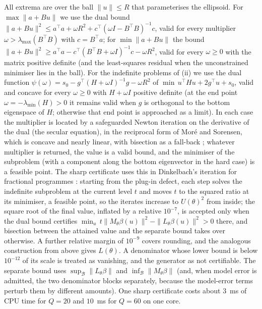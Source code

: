 All extrema are over the ball $\|u\| \le R$ that parameterises the ellipsoid.
For $\max\|a + Bu\|$ we use the dual bound $\|a+Bu\|^2 \le a^{\!\top}a + \omega R^2
+ c^{\!\top}(\omega I - B^{\!\top}B)^{-1}c$, valid for every multiplier $\omega >
\lambda_{\max}(B^{\!\top}B)$ with $c = B^{\!\top}a$; for $\min\|a+Bu\|$ the bound
$\|a+Bu\|^2 \ge a^{\!\top}a - c^{\!\top}(B^{\!\top}B + \omega I)^{-1}c - \omega R^2$,
valid for every $\omega \ge 0$ with the matrix positive definite (and the
least-squares residual when the unconstrained minimiser lies in the ball). For
the indefinite problems of (ii) we use the dual function
$\psi(\omega) = s_0 - g^{\!\top}(H + \omega I)^{-1}g - \omega R^2$ of
$\min\,u^{\!\top}Hu + 2g^{\!\top}u + s_0$, valid and concave for every
$\omega \ge 0$ with $H + \omega I$ positive definite (at the end point $\omega =
-\lambda_{\min}(H) > 0$ it remains valid when $g$ is orthogonal to the bottom
eigenspace of $H$; otherwise that end point is approached as a limit). In each case the multiplier is located by a safeguarded Newton iteration
on the derivative of the dual (the secular equation), in the reciprocal form of
Mor\'e and Sorensen, which is concave and nearly linear, with bisection as a
fall-back \citep{gander1989constrained,more1983computing,conn2000trust};
whatever multiplier is returned, the value is a valid bound, and the minimiser
of the subproblem (with a component along the bottom eigenvector in the hard
case) is a feasible point. The sharp certificate uses this in Dinkelbach's
iteration for fractional programmes \citep{dinkelbach1967nonlinear}: starting
from the plug-in defect, each step solves the indefinite subproblem at the
current level $t$ and moves $t$ to the squared ratio at its minimiser, a
feasible point, so the iterates increase to $U(\theta)^2$ from inside; the
square root of the final value, inflated by a relative $10^{-7}$, is accepted
only when the dual
bound certifies $\min_u\, t\|M_\theta\beta(u)\|^2 - \|L_\theta\beta(u)\|^2 > 0$
there, and bisection between the attained value and the separate bound takes
over otherwise. A further relative margin of $10^{-9}$ covers rounding, and the
analogous construction from above gives $L(\theta)$. A denominator whose lower
bound is below $10^{-12}$ of its scale is treated as vanishing, and the
generator as not certifiable. The separate bound uses
$\sup_{\mathcal B}\|L_\theta\beta\|$ and $\inf_{\mathcal B}\|M_\theta\beta\|$ (and,
when model error is admitted, the two denominator blocks separately, because
the model-error terms perturb them by different amounts). One sharp
certificate costs about $3$~ms of CPU time for $Q = 20$ and $10$~ms for
$Q = 60$ on one core.

